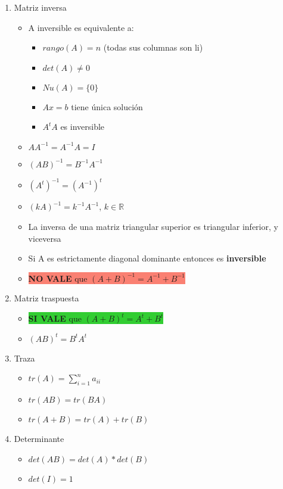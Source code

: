 \begin{enumerate}
\begin{itemize}
    \end{itemize}    
    
    \item Matriz inversa
    \begin{itemize}
    \item A inversible es equivalente a:
        \begin{itemize}
        \item $rango(A) = n$ (todas sus columnas son li)
        \item $det(A)\neq0$
        \item $Nu(A) = \{0\}$
        \item $Ax=b$ tiene única solución
        \item $A^tA$ es inversible
        \end{itemize}
    \item $AA^{-1} = A^{-1}A = I$
    \item $(AB)^{-1} = B^{-1}A^{-1}$
    \item $(A^t)^{-1} = (A^{-1})^t$
    \item $(kA)^{-1} = k^{-1} A^{-1}$, $k\in\mathbb{R}$
    \item La inversa de una matriz triangular superior es triangular inferior, y viceversa
    \item \colorbox{Dandelion}{Si A es estrictamente diagonal dominante entonces es \textbf{inversible}}
    \item \colorbox{Salmon}{\textbf{NO VALE} que $(A+B)^{-1} = A^{-1} + B^{-1}$}
    \end{itemize}
    \item Matriz traspuesta
    \begin{itemize}
        \item \colorbox{LimeGreen}{\textbf{SI VALE} que $(A+B)^t = A^t + B^t$}
        \item $(AB)^t = B^tA^t$
    \end{itemize}
    \item Traza
    \begin{itemize}
        \item $tr(A) = \sum_{i=1}^{n}a_{ii}$ 
    \item $tr(AB) = tr(BA)$
    \item $tr(A+B) = tr(A)+tr(B)$
    \end{itemize}
    \item Determinante
    \begin{itemize}
        \item $det(AB) = det(A)*det(B)$
        \item $det(I) = 1$

\end{itemize}
\end{enumerate}
